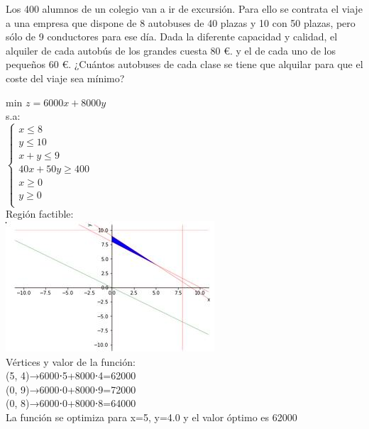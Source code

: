 \documentclass[addpoints,spanish, 12pt,a4paper]{exam}
\begin{document}
\begin{questions}
\question[3] Los 400 alumnos de un colegio van a ir de excursión. Para ello se contrata el viaje a una
empresa que dispone de 8 autobuses de 40 plazas y 10 con 50 plazas, pero sólo de 9 conductores para ese
día. Dada la diferente capacidad y calidad, el alquiler de cada autobús de los grandes cuesta 80 \euro. y
el de cada uno de los pequeños 60 \euro . ¿Cuántos autobuses de cada clase se tiene
que alquilar para que el coste del viaje sea mínimo?

\begin{solution}
min $z=6000 x + 8000 y$ \\
s.a: \\
$\left\{ \begin{matrix}x \leq 8  \\ y \leq 10 \\ x+y \leq 9 \\ 40x+50y \geq 400 \\ x \geq 0 \\ y \geq 0 \\ \end{matrix}\right.$ \\
Región factible:\\
\includegraphics[scale=0.30]{region1.jpg} \\

Vértices y valor de la función: \\

(5, 4)→6000⋅5+8000⋅4=62000\\
(0, 9)→6000⋅0+8000⋅9=72000\\
(0, 8)→6000⋅0+8000⋅8=64000\\

La función se optimiza para x=5, y=4.0 y el valor óptimo es 62000
\end{solution}









\end{questions}
\end{document}
